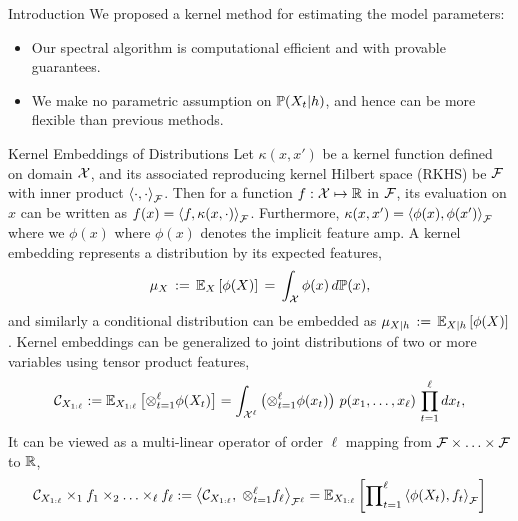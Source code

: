 \documentclass[final,t]{beamer}
\begin{document}
\begin{frame}{}
\begin{columns}[T]
\begin{column}{.3\linewidth}
\begin{block}{Introduction}
        We proposed a \alert{kernel} method for estimating the model parameters:
        \begin{itemize}
        \item Our spectral algorithm is computational efficient and with provable guarantees.
        \item We make no parametric assumption on $\mathbb{P}(X_t|h)$, and hence can be more flexible than previous methods. 
        \end{itemize}
      \end{block}
      \vspace{-0.5in}
      \begin{block}{Kernel Embeddings of Distributions}
        Let $\kappa(x,x')$ be a kernel function defined on domain $\mathcal{X}$, and its associated reproducing kernel Hilbert space (RKHS) be $\mathcal{F}$ with inner product $\left\langle \cdot,\cdot \right\rangle_{\mathcal{F}}$. Then for a function $f:\mathcal{X} \mapsto \mathbb{R}$ in $\mathcal{F}$, its evaluation on $x$ can be written as $f(x)=\left\langle f,\kappa(x,\cdot) \right\rangle_{\mathcal{F}}$. Furthermore, $\kappa(x, x') = \left\langle \phi(x),\phi(x') \right\rangle_{\mathcal{F}}$ where we $\phi(x)$ where $\phi(x)$ denotes the implicit feature amp. A kernel embedding represents a distribution by its expected features,
        \begin{align*}
          \mu_{X} \, := \, \mathbb{E}_{X} \left[\phi(X)\right] \, = \, \int_{\mathcal{X}} \phi(x) \, d\mathbb{P}(x), 
        \end{align*}
        and similarly a conditional distribution can be embedded as 
        $
          \mu_{X|h} \, := \, \mathbb{E}_{X|h} \left[\phi(X)\right] 
        $.
        Kernel embeddings can be generalized to joint distributions of two or more variables using tensor product features, 
        \begin{eqnarray*}
            \mathcal{C}_{X_{1:\ell}}
            := \mathbb{E}_{X_{1:\ell}}\left[\otimes_{t=1}^\ell \phi(X_t)\right]
            = \int_{\mathcal{X}^\ell} \left(\otimes_{t=1}^\ell \phi(x_t)\right)
            \,p(x_1,\ldots,x_\ell)\, \prod_{t=1}^\ell dx_t, 
        \end{eqnarray*}
        It can be viewed as a \alert{multi-linear operator} of order $\ell$ mapping
        from $\mathcal{F}\times\ldots\times \mathcal{F}$ to $\mathbb{R}$,
        \begin{eqnarray*}
        \Ccal_{X_{1:\ell}} \times_1 f_1 \times_2 \ldots \times_\ell f_\ell := \inner{\Ccal_{X_{1:\ell}}}{\;\otimes_{t=1}^\ell f_\ell}_{\Fcal^\ell}
        =\EE_{X_{1:\ell}}\sbr{\prod\nolimits_{t=1}^\ell \inner{\phi(X_t)}{f_t}_{\Fcal}}

\end{eqnarray*}
\end{block}
\end{column}
\end{columns}
\end{frame}
\end{document}
